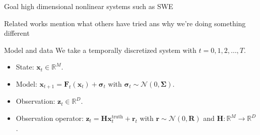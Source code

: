 \documentclass[aspectratio=169]{beamer}
\newcommand{\R}{\mathbb{R}}
\newcommand{\state}{\boldsymbol{x}}
\newcommand{\observation}{\boldsymbol{z}}
\newcommand{\obsop}{\boldsymbol{H}}
\newcommand{\modelerror}{\boldsymbol{\sigma}}
\newcommand{\modelcovariance}{\boldsymbol{\Sigma}}
\newcommand{\observationerror}{\boldsymbol{r}}
\newcommand{\observationcovariance}{\boldsymbol{R}}
\newcommand{\modelf}{\boldsymbol{F}}
\begin{document}

\begin{frame}{Goal}
    high dimensional nonlinear systems such as SWE
\end{frame}



\begin{frame}{Related works}
    mention what others have tried ans why we're doing something different
\end{frame}


\begin{frame}{Model and data}
\vfill
We take a temporally discretized system with $t=0,1,2,\dots, T$. 
    \begin{itemize}
        \item State: $\state_t \in \R^M$.
        \item Model: $\state_{t+1} = \modelf_t(\state_t) + \modelerror_t$ with $\modelerror_t \sim \mathcal{N}(0,\modelcovariance)$.
        \item Observation: $\observation_t \in \R^D$.
        \item Observation operator: $\observation_t = \obsop \state_t^{\textrm{truth}} + \observationerror_t$ with $\observationerror \sim \mathcal{N}(0,\observationcovariance)$ and $\obsop\colon \R^M \to \R^D$.
    \end{itemize}
\vfill
\end{frame}

\end{document}
